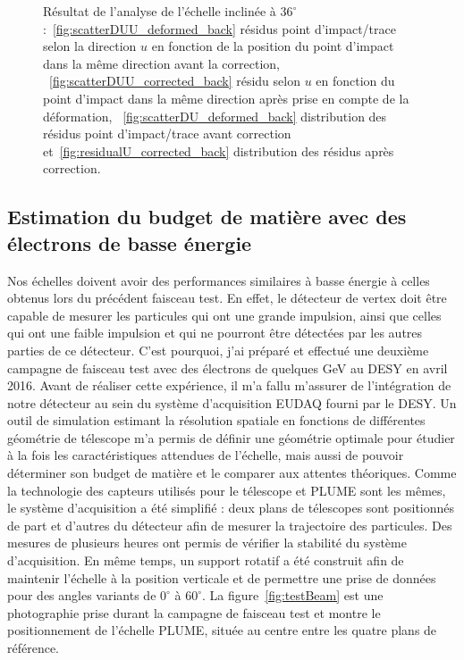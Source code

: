 \begin{figure}[!h]
    \caption{Résultat de l'analyse de l'échelle inclinée à $36^{\circ}$ :~\ref{fig:scatterDUU_deformed_back} résidus point d'impact/trace selon la direction $u$ en fonction de la position du point d'impact dans la même direction avant la correction, ~\ref{fig:scatterDUU_corrected_back} résidu selon $u$ en fonction du point d'impact dans la même direction après prise en compte de la déformation, ~\ref{fig:scatterDU_deformed_back} distribution des résidus point d'impact/trace avant correction et~\ref{fig:residualU_corrected_back} distribution des résidus après correction.}
    \label{fig:defCor} 
   \end{figure}

    \subsection{Estimation du budget de matière avec des électrons de basse énergie}

  Nos échelles doivent avoir des performances similaires à basse énergie à celles obtenus lors du précédent faisceau test.
  En effet, le détecteur de vertex doit être capable de mesurer les particules qui ont une grande impulsion, ainsi que celles qui ont une faible impulsion et qui ne pourront être détectées par les autres parties de ce détecteur.
  C'est pourquoi, j'ai préparé et effectué une deuxième campagne de faisceau test avec des électrons de quelques GeV au DESY en avril 2016.
  Avant de réaliser cette expérience, il m'a fallu m'assurer de l'intégration de notre détecteur au sein du système d'acquisition EUDAQ fourni par le DESY. 
  Un outil de simulation estimant la résolution spatiale en fonctions de différentes géométrie de télescope m'a permis de définir une géométrie optimale pour étudier à la fois les caractéristiques attendues de l'échelle, mais aussi de pouvoir déterminer son budget de matière et le comparer aux attentes théoriques.
  Comme la technologie des capteurs utilisés pour le télescope et PLUME sont les mêmes, le système d'acquisition a été simplifié : deux plans de télescopes sont positionnés de part et d'autres du détecteur afin de mesurer la trajectoire des particules. 
  Des mesures de plusieurs heures ont permis de vérifier la stabilité du système d'acquisition. 
  En même temps, un support rotatif a été construit afin de maintenir l'échelle à la position verticale et de permettre une prise de données pour des angles variants de $0^{\circ}$ à $60^{\circ}$.
  La figure~\ref{fig:testBeam} est une photographie prise durant la campagne de faisceau test et montre le positionnement de l'échelle PLUME, située au centre entre les quatre plans de référence.

